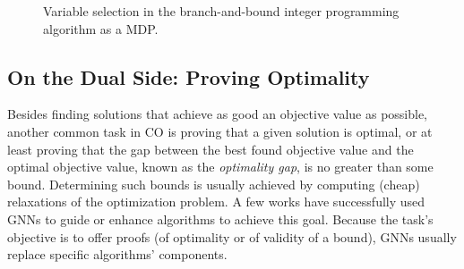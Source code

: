 \documentclass[twoside,11pt]{article}
\newcommand{\new}[1]{\emph{#1}}
\begin{document}
\begin{figure}[t]


	\caption{Variable selection in the branch-and-bound integer programming algorithm as a MDP.}
	\label{fig:BnB-mdp}

\end{figure}

\subsection{On the Dual Side: Proving Optimality}\label{bb}

Besides finding solutions that achieve as good an objective value as possible, another common task in CO is proving that a given solution is optimal, or at least proving that the gap between the best found objective value and the optimal objective value, known as the \new{optimality gap}, is no greater than some bound. Determining such bounds is usually achieved by computing (cheap) relaxations of the optimization problem. A few works have successfully used GNNs to guide or enhance algorithms to achieve this goal. Because the task's objective is to offer proofs (of optimality or of validity of a bound), GNNs usually replace specific algorithms' components.
\end{document}
